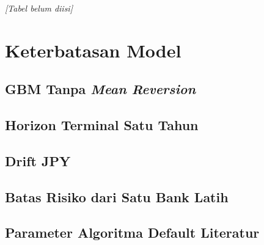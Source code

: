         \begin{table}[H]
            \centering
            \caption{Perubahan bobot portofolio hasil optimasi terhadap komposisi eksisting 2024}\label{tab:weight change}
            \textit{[Tabel belum diisi]}
        \end{table}

    \section{Keterbatasan Model}\label{sec:limitations}

        \subsection{GBM Tanpa \textit{Mean Reversion}}\label{subsec:no mean reversion}

        \subsection{Horizon Terminal Satu Tahun}\label{subsec:one year horizon}

        \subsection{Drift JPY}\label{subsec:jpy drift}

        \subsection{Batas Risiko dari Satu Bank Latih}\label{subsec:single bank limits}

        \subsection{Parameter Algoritma Default Literatur}\label{subsec:default parameters}

